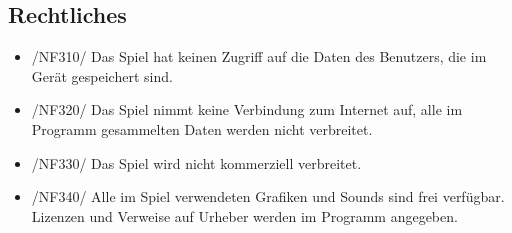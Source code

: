 \subsection{Rechtliches}
\begin{itemize}
\item /NF310/ Das Spiel hat keinen Zugriff auf die Daten des Benutzers, die im Gerät gespeichert sind.
\item /NF320/ Das Spiel nimmt keine Verbindung zum Internet auf, alle im Programm gesammelten Daten werden nicht verbreitet.
\item /NF330/ Das Spiel wird nicht kommerziell verbreitet.
\item /NF340/ Alle im Spiel verwendeten Grafiken und Sounds sind frei verfügbar. Lizenzen und Verweise auf Urheber werden im Programm angegeben.
\end{itemize}